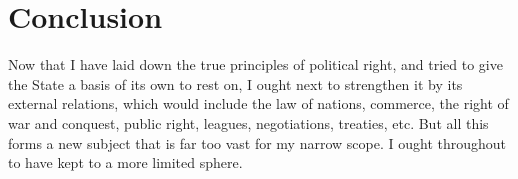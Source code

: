 \documentclass[12pt]{book}
\begin{document}
\section{Conclusion}
Now that I have laid down the true principles of political right, and tried to give the State a basis of its own to rest on, I ought next to strengthen it by its external relations, which would include the law of nations, commerce, the right of war and conquest, public right, leagues, negotiations, treaties, etc. But all this forms a new subject that is far too vast for my narrow scope. I ought throughout to have kept to a more limited sphere.
\end{document}
